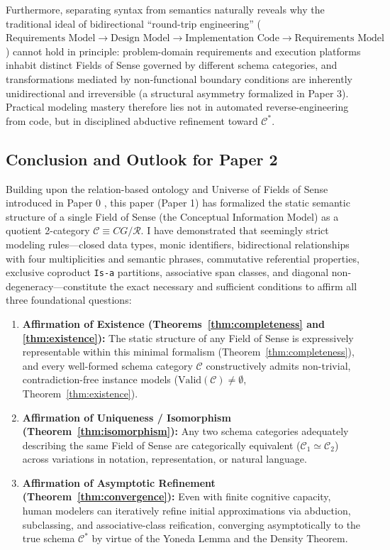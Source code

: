 \documentclass[11pt,a4paper]{article}
\theoremstyle{definition}
\theoremstyle{plain}
\theoremstyle{remark}
\newcommand{\Valid}{\mathrm{Valid}}
\begin{document}
Furthermore, separating syntax from semantics naturally reveals why the traditional ideal of bidirectional ``round-trip engineering'' ($\text{Requirements Model} \to \text{Design Model} \to \text{Implementation Code} \to \text{Requirements Model}$) cannot hold in principle: problem-domain requirements and execution platforms inhabit distinct Fields of Sense governed by different schema categories, and transformations mediated by non-functional boundary conditions are inherently unidirectional and irreversible (a structural asymmetry formalized in Paper 3). Practical modeling mastery therefore lies not in automated reverse-engineering from code, but in disciplined abductive refinement toward $\mathcal{C}^*$.

\subsection{Conclusion and Outlook for Paper 2}
Building upon the relation-based ontology and Universe of Fields of Sense introduced in Paper 0 \cite{ota2026paper0}, this paper (Paper 1) has formalized the static semantic structure of a single Field of Sense (the Conceptual Information Model) as a quotient 2-category $\mathcal{C} \equiv CG/\mathcal{R}$. I have demonstrated that seemingly strict modeling rules---closed data types, monic identifiers, bidirectional relationships with four multiplicities and semantic phrases, commutative referential properties, exclusive coproduct \texttt{Is-a} partitions, associative span classes, and diagonal non-degeneracy---constitute the exact necessary and sufficient conditions to affirm all three foundational questions:
\begin{enumerate}
    \item \textbf{Affirmation of Existence (Theorems~\ref{thm:completeness} and \ref{thm:existence}):} The static structure of any Field of Sense is expressively representable within this minimal formalism (Theorem~\ref{thm:completeness}), and every well-formed schema category $\mathcal{C}$ constructively admits non-trivial, contradiction-free instance models ($\Valid(\mathcal{C}) \neq \emptyset$, Theorem~\ref{thm:existence}).
    \item \textbf{Affirmation of Uniqueness / Isomorphism (Theorem~\ref{thm:isomorphism}):} Any two schema categories adequately describing the same Field of Sense are categorically equivalent ($\mathcal{C}_1 \simeq \mathcal{C}_2$) across variations in notation, representation, or natural language.
    \item \textbf{Affirmation of Asymptotic Refinement (Theorem~\ref{thm:convergence}):} Even with finite cognitive capacity, human modelers can iteratively refine initial approximations via abduction, subclassing, and associative-class reification, converging asymptotically to the true schema $\mathcal{C}^*$ by virtue of the Yoneda Lemma and the Density Theorem.
\end{enumerate}
\end{document}

